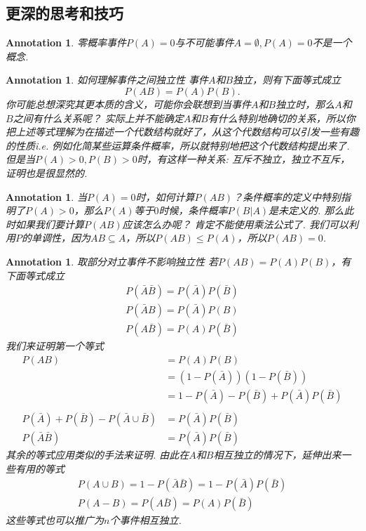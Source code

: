 \documentclass{article}
\newtheorem{annotation}[theorem]{Annotation}
\begin{document}
\newpage
\subsection{更深的思考和技巧}

\begin{annotation}
\rm {\color{red} 零概率事件$P(A) = 0$与不可能事件$A=\emptyset,P(A) = 0$不是一个概念}.
\end{annotation}


\begin{annotation}
\rm {\color{red} 如何理解事件之间独立性} 事件$A$和$B$独立，则有下面等式成立
$$
P(AB) = P(A)P(B). 
$$
你可能总想深究其更本质的含义，可能你会联想到当事件$A$和$B$独立时，那么$A$和$B$之间有什么关系呢？ 实际上并{\color{blue}不能确定$A$和$B$有什么特别地确切的关系}，所以你把上述等式理解为在描述一个代数结构就好了，从这个代数结构可以引发一些有趣的性质i.e. 例如化简某些运算{\color{blue}条件概率}，所以就特别地把这个代数结构提出来了. 但是当$P(A)>0, P(B) > 0$时，有这样一种关系: {\color{red} 互斥不独立，独立不互斥}，证明也是很显然的.
\end{annotation}

\begin{annotation}
\rm {\color{red} 当$P(A) = 0$时，如何计算$P(AB)$？}条件概率的定义中特别指明了$P(A) > 0$，那么$P(A)$等于$0$时候，条件概率$P(B|A)$是未定义的. 那么此时如果我们要计算$P(AB)$应该怎么办呢？ 肯定不能使用乘法公式了. 我们可以利用$P$的{\color{blue}单调性}，因为$AB \subseteq A$，所以$P(AB) \leq P(A)$，所以$P(AB)=0$.
\end{annotation}

\begin{annotation}
\rm {\color{red} 取部分对立事件不影响独立性} 若$P(AB) = P(A)P(B)$，有下面等式成立
$$
\begin{array}{l}
P(\bar{A}\bar{B}) = P(\bar{A})P(\bar{B})\\
P(\bar{A}B) = P(\bar{A})P(B)\\
P(A\bar{B}) = P(A)P(\bar{B})
\end{array}
$$
我们来证明第一个等式
$$
\begin{array}{rl}
P(AB) &= P(A)P(B) \\
	  &= (1-P(\bar{A}))(1-P(\bar{B}))\\
	  &= 1-P(\bar{A})-P(\bar{B}) + P(\bar{A})P(\bar{B})\\
	  \\
P(\bar{A}) + P(\bar{B}) - P(\bar{A} \cup \bar{B}) &= P(\bar{A})P(\bar{B}) \\
P(\bar{A}\bar{B}) &= P(\bar{A})P(\bar{B})
\end{array}
$$
其余的等式应用类似的手法来证明. 由此在$A$和$B$相互独立的情况下，延伸出来一些有用的等式
$$
\begin{array}{l}
P(A \cup B) = 1 - P(\bar{A}\bar{B}) = 1-P(\bar{A})P(\bar{B})\\
P(A-B) = P(A\bar{B}) = P(A)P(\bar{B}) 
\end{array}
$$
这些等式也可以推广为$n$个事件相互独立.
\end{annotation}
\end{document}
